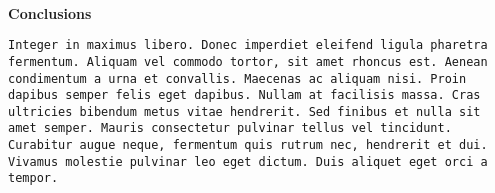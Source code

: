\documentclass[11pt]{article}
\begin{document}
\hfill \\
{\bfseries\large Conclusions}
\begin{lstlisting}[mathescape]
Integer in maximus libero. Donec imperdiet eleifend ligula pharetra fermentum. Aliquam vel commodo tortor, sit amet rhoncus est. Aenean condimentum a urna et convallis. Maecenas ac aliquam nisi. Proin dapibus semper felis eget dapibus. Nullam at facilisis massa. Cras ultricies bibendum metus vitae hendrerit. Sed finibus et nulla sit amet semper. Mauris consectetur pulvinar tellus vel tincidunt. Curabitur augue neque, fermentum quis rutrum nec, hendrerit et dui. Vivamus molestie pulvinar leo eget dictum. Duis aliquet eget orci a tempor.
\end{lstlisting}
\hfill \\
\end{document}
